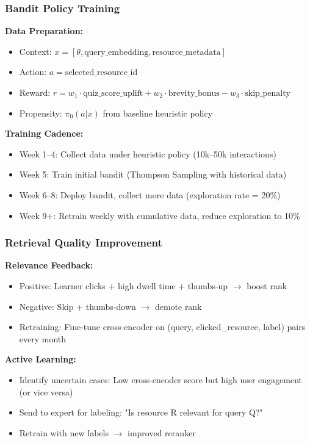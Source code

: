 \documentclass[11pt,letterpaper]{article}
\begin{document}
\subsubsection{Bandit Policy Training}

\textbf{Data Preparation:}
\begin{itemize}
\item Context: $x = [\theta, \text{query\_embedding}, \text{resource\_metadata}]$
\item Action: $a = \text{selected\_resource\_id}$
\item Reward: $r = w_1 \cdot \text{quiz\_score\_uplift} + w_2 \cdot \text{brevity\_bonus} - w_3 \cdot \text{skip\_penalty}$
\item Propensity: $\pi_0(a|x)$ from baseline heuristic policy
\end{itemize}

\textbf{Training Cadence:}
\begin{itemize}
\item Week 1--4: Collect data under heuristic policy (10k--50k interactions)
\item Week 5: Train initial bandit (Thompson Sampling with historical data)
\item Week 6--8: Deploy bandit, collect more data (exploration rate = 20\%)
\item Week 9+: Retrain weekly with cumulative data, reduce exploration to 10\%
\end{itemize}

\subsubsection{Retrieval Quality Improvement}

\textbf{Relevance Feedback:}
\begin{itemize}
\item Positive: Learner clicks + high dwell time + thumbs-up $\rightarrow$ boost rank
\item Negative: Skip + thumbs-down $\rightarrow$ demote rank
\item Retraining: Fine-tune cross-encoder on (query, clicked\_resource, label) pairs every month
\end{itemize}

\textbf{Active Learning:}
\begin{itemize}
\item Identify uncertain cases: Low cross-encoder score but high user engagement (or vice versa)
\item Send to expert for labeling: "Is resource R relevant for query Q?"
\item Retrain with new labels $\rightarrow$ improved reranker
\end{itemize}
\end{document}
